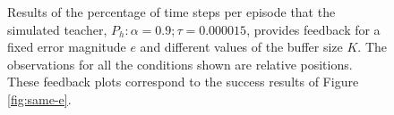  \begin{figure}[H]
  \centering
{}
   \hfill
  \hfill
  \caption{Results of the percentage of time steps per episode that the simulated teacher, $P_h: \alpha = 0.9; \tau =  0.000015$,  provides feedback for a fixed error magnitude $e$ and different values of the buffer size $K$. The observations for all the conditions shown are relative positions. These feedback plots correspond to the success results of Figure \ref{fig:same-e}.}
  \label{fig:same-e-feedback}
\end{figure}





